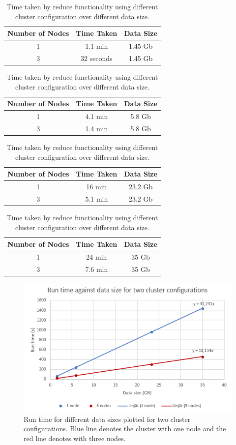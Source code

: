 \begin{table}[]
    \centering
    \begin{tabular}{|c|c|c|}
\hline
Number of Nodes  & Time Taken & Data Size \\ \hline
        1 & 1.1 min & 1.45 Gb \\ \hline
        3 & 32 seconds & 1.45 Gb \\
\hline
\end{tabular}
\quad
\begin{tabular}{|c|c|c|}
\hline
Number of Nodes  & Time Taken & Data Size \\ \hline
        1 & 4.1 min & 5.8 Gb \\ \hline
        3 & 1.4 min & 5.8 Gb \\
\hline
\end{tabular}
\begin{tabular}{|c|c|c|}
\hline
Number of Nodes  & Time Taken & Data Size \\ \hline
        1 & 16 min & 23.2 Gb \\ \hline
        3 & 5.1 min & 23.2 Gb \\
\hline
\end{tabular}
\quad
\begin{tabular}{|c|c|c|}
\hline
Number of Nodes  & Time Taken & Data Size \\ \hline
        1 & 24 min & 35 Gb \\ \hline
        3 & 7.6 min & 35 Gb \\
\hline
\end{tabular}
    \caption{Time taken by reduce functionality using different cluster configuration over different data size.}
    \label{table_time}
\end{table}






\begin{figure}[H]
    \centering
    \includegraphics[width=.75\linewidth]{figures/runTime2.PNG}
    \caption{Run time for different data sizes plotted for two cluster configurations. Blue line denotes the cluster with one node and the red line denotes with three nodes.}
    \label{fig:scalabilityGraph}
\end{figure}

